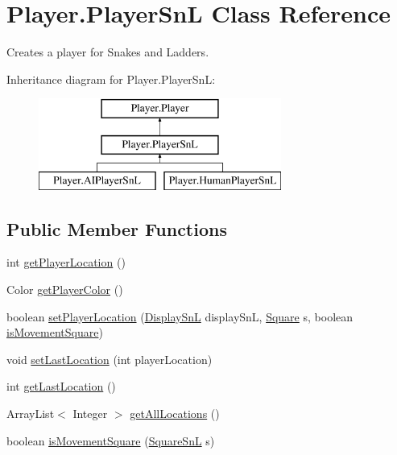 \hypertarget{class_player_1_1_player_sn_l}{}\section{Player.\+Player\+Sn\+L Class Reference}
\label{class_player_1_1_player_sn_l}


Creates a player for Snakes and Ladders.  


Inheritance diagram for Player.\+Player\+Sn\+L\+:\begin{figure}[H]
\begin{center}
\leavevmode
\includegraphics[height=3.000000cm]{class_player_1_1_player_sn_l}
\end{center}
\end{figure}
\subsection*{Public Member Functions}
\begin{DoxyCompactItemize}
\item 
int \hyperlink{class_player_1_1_player_sn_l_a36a358c20cb0f45cc87e7975befebbcc}{get\+Player\+Location} ()
\item 
Color \hyperlink{class_player_1_1_player_sn_l_a7d5b12033c99b19fda1be39e30470b2c}{get\+Player\+Color} ()
\item 
boolean \hyperlink{class_player_1_1_player_sn_l_a0b10f61660837878f6d3b9306b9cc8f3}{set\+Player\+Location} (\hyperlink{class_display_1_1_display_sn_l}{Display\+Sn\+L} display\+Sn\+L, \hyperlink{class_square_1_1_square}{Square} s, boolean \hyperlink{class_player_1_1_player_sn_l_a643b8e902d4c0701ead60eea0099107b}{is\+Movement\+Square})
\item 
void \hyperlink{class_player_1_1_player_sn_l_a31b9b469c7aabb27b5da8c38699587f3}{set\+Last\+Location} (int player\+Location)
\item 
int \hyperlink{class_player_1_1_player_sn_l_ac13c20e8675be07704620e1e54e714cc}{get\+Last\+Location} ()
\item 
Array\+List$<$ Integer $>$ \hyperlink{class_player_1_1_player_sn_l_a2f2c8d17959786a2c6ed0770fdf2d4df}{get\+All\+Locations} ()
\item 
boolean \hyperlink{class_player_1_1_player_sn_l_a643b8e902d4c0701ead60eea0099107b}{is\+Movement\+Square} (\hyperlink{class_square_1_1_square_sn_l}{Square\+Sn\+L} s)
\end{DoxyCompactItemize}

